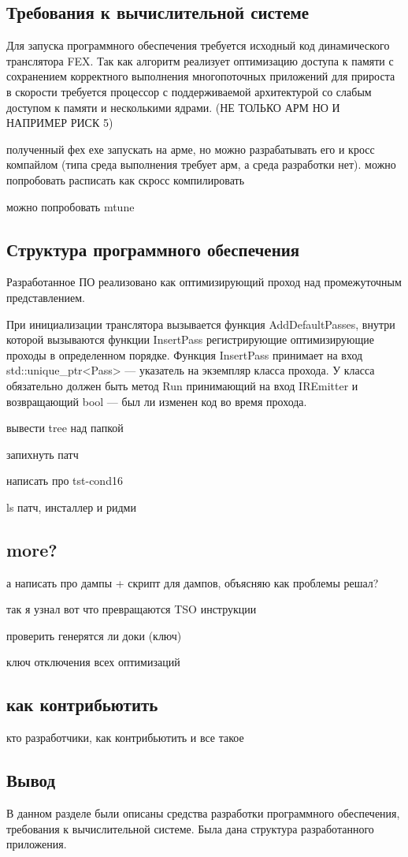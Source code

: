 \subsection{Требования к вычислительной системе}

Для запуска программного обеспечения требуется исходный код динамического транслятора FEX. Так как алгоритм реализует оптимизацию доступа к памяти с сохранением корректного выполнения многопоточных приложений для прироста в скорости требуется процессор с поддерживаемой архитектурой со слабым доступом к памяти и несколькими ядрами. (НЕ ТОЛЬКО АРМ НО И НАПРИМЕР РИСК 5)

полученный фех ехе запускать на арме, но можно разрабатывать его и кросс компайлом (типа среда выполнения требует арм, а среда разработки нет). можно попробовать расписать как скросс компилировать

можно попробовать mtune

\subsection{Структура программного обеспечения}

Разработанное ПО реализовано как оптимизирующий проход над промежуточным представлением.

При инициализации транслятора вызывается функция AddDefaultPasses, внутри которой вызываются функции InsertPass регистрирующие оптимизирующие проходы в определенном порядке. Функция InsertPass принимает на вход std::unique\_ptr<Pass> --- указатель на экземпляр класса прохода. У класса обязательно должен быть метод Run принимающий на вход IREmitter и возвращающий bool --- был ли изменен код во время прохода.

вывести tree над папкой

запихнуть патч

написать про tst-cond16

ls патч, инсталлер и ридми

\subsection{more?}

а написать про дампы + скрипт для дампов, объясняю как проблемы решал?

так я узнал вот что превращаются TSO инструкции

проверить генерятся ли доки (ключ)

ключ отключения всех оптимизаций

\subsection{как контрибьютить}

кто разработчики, как контрибьютить и все такое

\subsection{Вывод}

В данном разделе были описаны средства разработки программного
обеспечения, требования к вычислительной системе. Была дана структура
разработанного приложения.

\pagebreak